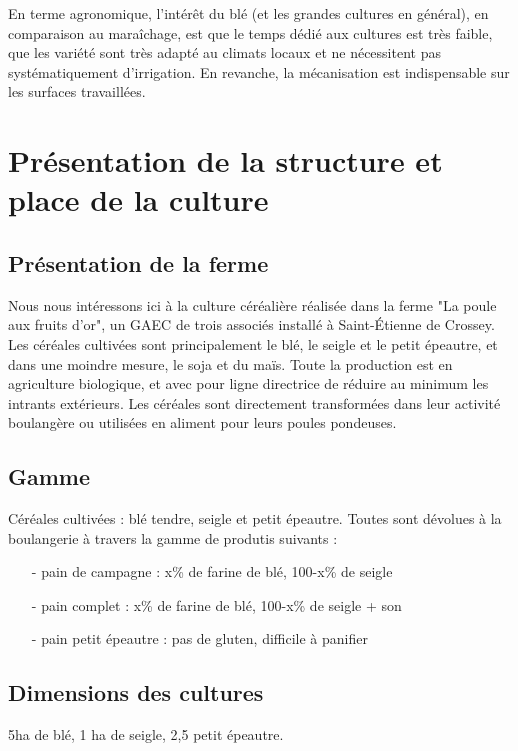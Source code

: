 \documentclass{article}
\begin{document}
En terme agronomique, l'intérêt du blé (et les grandes cultures en général), en comparaison au maraîchage, est que le temps dédié aux cultures est très faible, que les variété sont très adapté au climats locaux et ne nécessitent pas systématiquement d'irrigation. En revanche, la mécanisation est indispensable sur les surfaces travaillées. 

\section{Présentation de la structure et place de la culture}

\subsection{Présentation de la ferme}

Nous nous intéressons ici à la culture céréalière réalisée dans la ferme "La poule aux fruits d'or", un GAEC de trois associés installé à Saint-Étienne de Crossey. Les céréales cultivées sont principalement le blé, le seigle et le petit épeautre, et dans une moindre mesure, le soja et du maïs. Toute la production est en agriculture biologique, et avec pour ligne directrice de réduire au minimum les intrants extérieurs. Les céréales sont directement transformées dans leur activité boulangère ou utilisées en aliment pour leurs poules pondeuses.

\subsection{Gamme}

Céréales cultivées : blé tendre, seigle et petit épeautre. Toutes sont dévolues à la boulangerie à travers la gamme de produtis suivants :
\begin{itemize}
	\item[-] pain de campagne : x\% de farine de blé, 100-x\% de seigle
	\item[-] pain complet : x\% de farine de blé, 100-x\% de seigle + son
	\item[-] pain petit épeautre : pas de gluten, difficile à panifier
\end{itemize}

\subsection{Dimensions des cultures}

5ha de blé, 1 ha de seigle, 2,5 petit épeautre.
\end{document}
